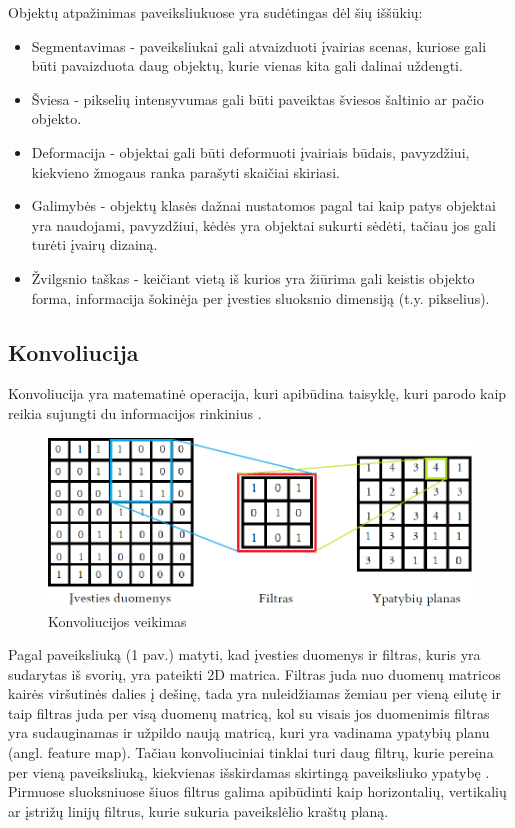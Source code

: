 \documentclass{VUMIFPSbakalaurinis}
\begin{document}
Objektų atpažinimas paveiksliukuose yra sudėtingas dėl šių iššūkių:
\begin{itemize}
\item Segmentavimas - paveiksliukai gali atvaizduoti įvairias scenas, kuriose gali būti pavaizduota daug objektų, kurie vienas kita gali dalinai uždengti.
\item Šviesa - pikselių intensyvumas gali būti paveiktas šviesos šaltinio ar pačio objekto.
\item Deformacija - objektai gali būti deformuoti įvairiais būdais, pavyzdžiui, kiekvieno žmogaus ranka parašyti skaičiai skiriasi.
\item Galimybės - objektų klasės dažnai nustatomos pagal tai kaip patys objektai yra naudojami, pavyzdžiui, kėdės yra objektai sukurti sėdėti, tačiau jos gali turėti įvairų dizainą.
\item Žvilgsnio taškas - keičiant vietą iš kurios yra žiūrima gali keistis objekto forma, informacija šokinėja per įvesties sluoksnio dimensiją (t.y. pikselius). 
\end{itemize}

\subsection{Konvoliucija}
Konvoliucija yra matematinė operacija, kuri apibūdina taisyklę, kuri parodo kaip reikia sujungti du informacijos rinkinius \cite{Convolution-book}. 

\begin{figure}[h]
    \centering
    \includegraphics[width=1\textwidth]{img/matrica.png}
    \caption{Konvoliucijos veikimas}
\end{figure}

Pagal paveiksliuką (1 pav.) matyti, kad įvesties duomenys ir filtras, kuris yra sudarytas iš svorių, yra pateikti 2D matrica. Filtras juda nuo duomenų matricos kairės viršutinės dalies į dešinę, 
tada yra nuleidžiamas žemiau per vieną eilutę ir taip filtras juda per visą duomenų matricą, kol su visais jos duomenimis filtras yra sudauginamas ir užpildo naują matricą, kuri 
yra vadinama ypatybių planu (angl. feature map).
Tačiau konvoliuciniai tinklai turi daug filtrų, kurie pereina per vieną paveiksliuką, kiekvienas išskirdamas skirtingą paveiksliuko ypatybę \cite{DBLP:journals/corr/abs-1708-08711}.
Pirmuose sluoksniuose šiuos filtrus galima apibūdinti kaip horizontalių, vertikalių ar įstrižų linijų filtrus, kurie sukuria paveikslėlio 
kraštų planą.
\end{document}
